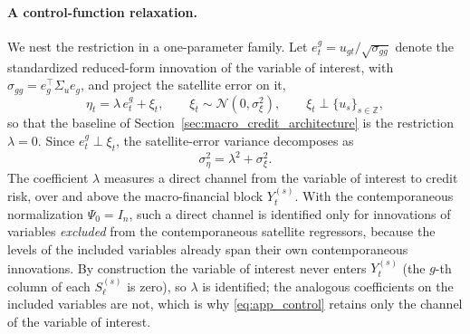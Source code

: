 \paragraph{A control-function relaxation.}
We nest the restriction in a one-parameter family. Let
$e_t^{g}=u_{gt}/\sqrt{\sigma_{gg}}$ denote the standardized reduced-form
innovation of the variable of interest, with $\sigma_{gg}=e_g^\top\Sigma_u e_g$,
and project the satellite error on it,
\begin{equation}
    \eta_t
    =
    \lambda\, e_t^{g} + \xi_t,
    \qquad
    \xi_t\sim\mathcal N(0,\sigma_\xi^2),
    \qquad
    \xi_t \perp \{u_s\}_{s\in\mathbb Z},
    \label{eq:app_control}
\end{equation}
so that the baseline of Section~\ref{sec:macro_credit_architecture} is the
restriction $\lambda=0$. Since $e_t^{g}\perp\xi_t$, the satellite-error variance
decomposes as
\begin{equation}
    \sigma_\eta^2 = \lambda^2 + \sigma_\xi^2 .
    \label{eq:app_var_decomp}
\end{equation}
The coefficient $\lambda$ measures a direct channel from the variable of
interest to credit risk, over and above the macro-financial block
$Y_t^{(s)}$. With the contemporaneous normalization $\Psi_0=I_n$, such a direct
channel is identified only for innovations of variables \emph{excluded} from the
contemporaneous satellite regressors, because the levels of the included
variables already span their own contemporaneous innovations. By construction
the variable of interest never enters $Y_t^{(s)}$ (the $g$-th column of each
$S_\ell^{(s)}$ is zero), so $\lambda$ is identified; the analogous coefficients
on the included variables are not, which is why \eqref{eq:app_control} retains
only the channel of the variable of interest.

